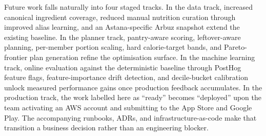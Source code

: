 Future work falls naturally into four staged tracks. In the data track, increased canonical ingredient coverage, reduced manual nutrition curation through improved alias learning, and an Astana-specific Arbuz snapshot extend the existing baseline. In the planner track, pantry-aware scoring, leftover-aware planning, per-member portion scaling, hard calorie-target bands, and Pareto-frontier plan generation refine the optimisation surface. In the machine learning track, online evaluation against the deterministic baseline through PostHog feature flags, feature-importance drift detection, and decile-bucket calibration unlock measured performance gains once production feedback accumulates. In the production track, the work labelled here as ``ready'' becomes ``deployed'' upon the team activating an AWS account and submitting to the App Store and Google Play. The accompanying runbooks, ADRs, and infrastructure-as-code make that transition a business decision rather than an engineering blocker.

\clearpage
